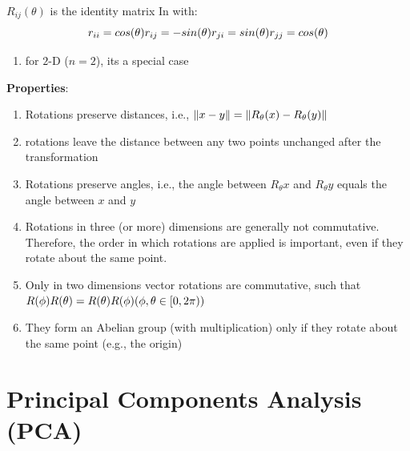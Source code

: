 $R_{ij}(\theta )$ is the identity matrix In with:
\[
    \hfill
    r_{ii} = cos(\theta )
    \hfill
    r_{ij} = -sin(\theta )
    \hfill
    r_{ji} = sin(\theta )
    \hfill
    r_{jj} = cos(\theta )
    \hfill
\]


\begin{enumerate}
    \item for $2$-D ($n=2$), its a special case
\end{enumerate}

\noindent
\textbf{Properties}:
\begin{enumerate}
    \item Rotations preserve distances, i.e., $\left\| x-y \right\| = \left\| R_\theta (x) - R_\theta (y) \right\|$

    \item rotations leave the distance between any two points unchanged after the transformation

    \item Rotations preserve angles, i.e., the angle between $R_\theta x$ and $R_\theta y$ equals the angle between $x$ and $y$

    \item Rotations in three (or more) dimensions are generally not commutative. Therefore, the order in which rotations are applied is important, even if they rotate about the same point. 

    \item Only in two dimensions vector rotations are commutative, such that 
    $
        R(\phi)R(\theta ) = R(\theta )R(\phi)
        \hfill
        (\phi, \theta  \in [0, 2\pi))
    $

    \item They form an Abelian group (with multiplication) only if they rotate about the same point (e.g., the origin)

\end{enumerate}



\section{Principal Components Analysis (PCA) \cite{dnn-deep-learning-ian}}\label{Principal Components Analysis (PCA)}

